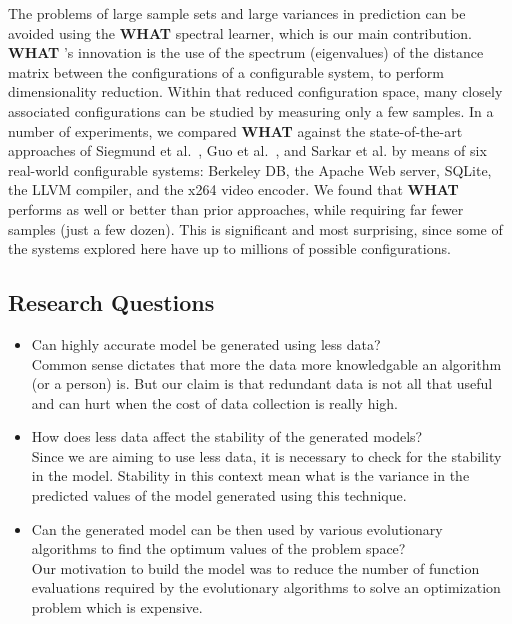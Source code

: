 \documentclass{newsig}
\newcommand{\what}{{\bf WHAT }}
\begin{document}
The problems of large sample sets and large variances in prediction can be avoided using the \what spectral learner, which is our main contribution.  
{\what}'s innovation is  the use of the spectrum (eigenvalues) of the distance matrix
between the configurations of a configurable system, to perform dimensionality reduction. Within that
reduced configuration space, many closely associated configurations can be studied
by measuring only a few samples.
In a number of experiments, we compared \what against the state-of-the-art approaches of Siegmund et al.~\cite{siegmund2012predicting}, Guo et al.~\cite{guo2013variability}, and Sarkar et al. \cite{sarkar2015cost} by means of six real-world configurable systems: Berkeley DB,  the Apache Web server, SQLite, the LLVM compiler, and the x264 video encoder.
We found that \what performs as well or better than prior approaches,
while  requiring far fewer samples (just a few dozen).
This is significant and most surprising, since some of the systems explored here have up to millions of possible configurations. 
 
 
 \subsection{Research Questions}
 \begin{itemize}
 \item{Can highly accurate model be generated using less data?\\
 Common sense dictates that more the data more knowledgable an algorithm (or a person) is. But our claim is that  redundant data is not all that useful and can hurt when the cost of data collection is really high.}
 \item{How does less data affect the stability of the generated models?\\
 Since we are aiming to use less data, it is necessary to check for the stability in the model. Stability in this context mean what is the variance in the predicted values of the model generated using this technique.}
 \item{Can the generated model can be then used by various evolutionary algorithms to find the optimum values of the problem space?\\
 Our motivation to build the model was to reduce the number of function evaluations required by the evolutionary algorithms to solve an optimization problem which is expensive. }
 \end{itemize}
 
\end{document}
